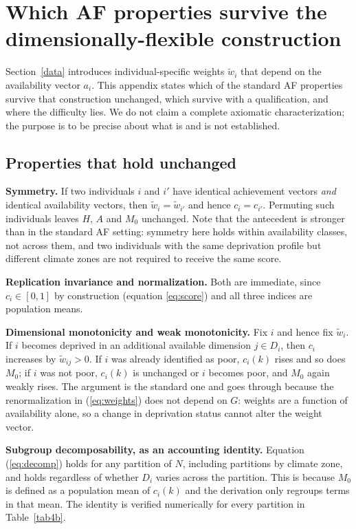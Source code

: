 \documentclass[11pt, a4paper]{article}
\begin{document}
\FloatBarrier

\section{Which AF properties survive the dimensionally-flexible construction}\label{app:axioms}

Section~\ref{data} introduces individual-specific weights $\tilde{w}_i$ that depend on the availability vector $a_i$. This appendix states which of the standard AF properties survive that construction unchanged, which survive with a qualification, and where the difficulty lies. We do not claim a complete axiomatic characterization; the purpose is to be precise about what is and is not established.

\subsection*{Properties that hold unchanged}

\textbf{Symmetry.} If two individuals $i$ and $i'$ have identical achievement vectors \emph{and} identical availability vectors, then $\tilde{w}_i = \tilde{w}_{i'}$ and hence $c_i = c_{i'}$. Permuting such individuals leaves $H$, $A$ and $M_0$ unchanged. Note that the antecedent is stronger than in the standard AF setting: symmetry here holds within availability classes, not across them, and two individuals with the same deprivation profile but different climate zones are not required to receive the same score.

\textbf{Replication invariance and normalization.} Both are immediate, since $c_i \in [0,1]$ by construction (equation \ref{eq:score}) and all three indices are population means.

\textbf{Dimensional monotonicity and weak monotonicity.} Fix $i$ and hence fix $\tilde{w}_i$. If $i$ becomes deprived in an additional available dimension $j \in D_i$, then $c_i$ increases by $\tilde{w}_{ij} > 0$. If $i$ was already identified as poor, $c_i(k)$ rises and so does $M_0$; if $i$ was not poor, $c_i(k)$ is unchanged or $i$ becomes poor, and $M_0$ again weakly rises. The argument is the standard one and goes through because the renormalization in (\ref{eq:weights}) does not depend on $G$: weights are a function of availability alone, so a change in deprivation status cannot alter the weight vector.

\textbf{Subgroup decomposability, as an accounting identity.} Equation (\ref{eq:decomp}) holds for any partition of $N$, including partitions by climate zone, and holds regardless of whether $D_i$ varies across the partition. This is because $M_0$ is defined as a population mean of $c_i(k)$ and the derivation only regroups terms in that mean. The identity is verified numerically for every partition in Table~\ref{tab4b}.
\end{document}
